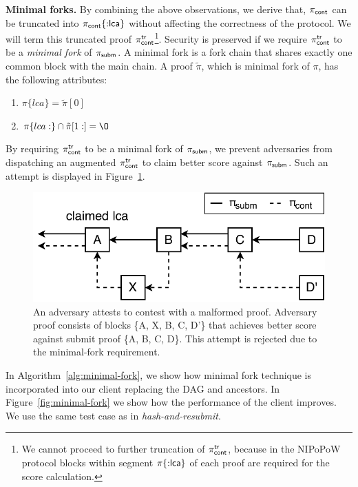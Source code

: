 \noindent \textbf{Minimal forks.} By combining the above observations, we
derive that, $\mathsf{\pi_{cont}}$ can be truncated into $\mathsf{\pi_{cont}}\{{:}\mathsf{lca}\}$ without
affecting the correctness of the protocol. We will term this truncated proof
$\mathsf{\pi_{cont}^{tr}}$\footnote{We cannot proceed to further truncation of $\mathsf{\pi_{cont}^{tr}}$, because
in the NIPoPoW protocol blocks within segment $\pi\{{:}\mathsf{lca}\}$ of each proof
are required for the score calculation.}. Security is preserved if we require
$\mathsf{\pi_{cont}^{tr}}$ to be a \emph{minimal fork} of $\mathsf{\pi_{subm}}$. A minimal fork is a fork chain
that shares exactly one common block with the main chain. A proof $\tilde\pi$,
which is minimal fork of $\pi$, has the following attributes:

\begin{enumerate}
\item $\pi\{lca\} = \tilde\pi[0]$
\item $\pi\{lca:\} \cap \tilde\pi[1:] = \O$
\end{enumerate}

By requiring $\mathsf{\pi_{cont}^{tr}}$ to be a minimal fork of $\mathsf{\pi_{subm}}$, we prevent adversaries
from dispatching an augmented $\mathsf{\pi_{cont}^{tr}}$ to claim better score against $\mathsf{\pi_{subm}}$.
Such an attempt is displayed in Figure~\ref{fig:adversary-minimal-fork}.

\begin{figure}[h]
    \begin{center}
        \includegraphics[width=0.7\columnwidth]{figures/adversary-minimal-fork.pdf}
    \end{center}

    \caption{An adversary attests to contest with a malformed proof. Adversary
        proof consists of blocks \{A, X, B, C, D'\} that achieves better score
        against submit proof \{A, B, C, D\}. This attempt is rejected due to
        the minimal-fork requirement.}

    \label{fig:adversary-minimal-fork}
\end{figure}

In Algorithm~\ref{alg:minimal-fork}, we show how minimal fork technique is
incorporated into our client replacing the DAG and ancestors. In
Figure~\ref{fig:minimal-fork} we show how the performance of the client
improves. We use the same test case as in \emph{hash-and-resubmit}.

